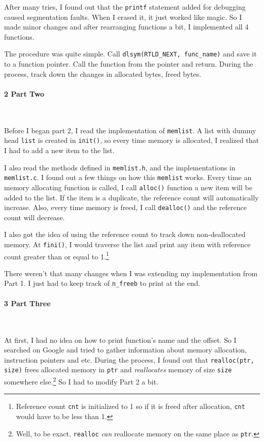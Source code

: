 \documentclass[12pt]{report}
\begin{document}
After many tries, I found out that the \texttt{printf} statement added for debugging caused segmentation faults. When I erased it, it just worked like magic. So I made minor changes and after rearranging functions a bit, I implemented all 4 functions.

The procedure was quite simple. Call \texttt{dlsym(RTLD\_NEXT, func\_name)} and save it to a function pointer. Call the function from the pointer and return. During the process, track down the changes in allocated bytes, freed bytes. \\

\paragraph*{\large 2 Part Two}~

Before I began part 2, I read the implementation of \texttt{memlist}. A list with dummy head \texttt{list} is created in \texttt{init()}, so every time memory is allocated, I realized that I had to add a new item to the list. 

I also read the methods defined in \texttt{memlist.h}, and the implementations in \texttt{memlist.c}. I found out a few things on how this \texttt{memlist} works. Every time an memory allocating function is called, I call \texttt{alloc()} function a new item will be added to the list. If the item is a duplicate, the reference count will automatically increase. Also, every time memory is freed, I call \texttt{dealloc()} and the reference count will decrease.

I also got the idea of using the reference count to track down non-deallocated memory. At \texttt{fini()}, I would traverse the list and print any item with reference count greater than or equal to 1.\footnote{Reference count \texttt{cnt} is initialized to 1 so if it is freed after allocation, \texttt{cnt} would have to be less than 1.}

There weren't that many changes when I was extending my implementation from Part 1. I just had to keep track of \texttt{n\_freeb} to print at the end.


\paragraph*{\large 3 Part Three}~

At first, I had no idea on how to print function's name and the offset. So I searched on Google and tried to gather information about memory allocation, instruction pointers and etc. During the process, I found out that \texttt{realloc(ptr, size)} frees allocated memory in \texttt{ptr} and \textit{reallocates} memory of size \texttt{size} somewhere else.\footnote{Well, to be exact, \texttt{realloc} \textit{can} reallocate memory on the same place as \texttt{ptr}.} So I had to modify Part 2 a bit.
\end{document}
